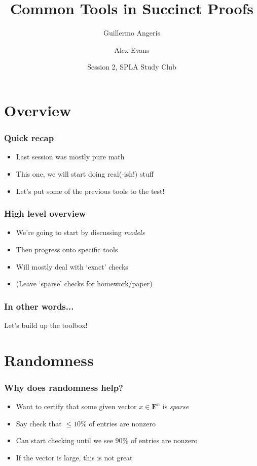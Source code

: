 \documentclass{beamer}
\title{Common Tools in Succinct Proofs}
\author{Guillermo Angeris \and Alex Evans}
\date{Session 2, SPLA Study Club}
\newcommand{\field}{\mathbf{F}}
\begin{document}
	\begin{frame}
		\titlepage
	\end{frame}
	
    \section{Overview}
    \begin{frame}
        \frametitle{Quick recap}
        \begin{itemize}\itemsep=12pt
            \item Last session was mostly pure math
            \item This one, we will start doing real(-ish!) stuff
            \pause
            \item Let's put some of the previous tools to the test!
        \end{itemize}
	\end{frame}

    \begin{frame}
        \frametitle{High level overview}
        \begin{itemize}\itemsep=12pt
            \item We're going to start by discussing \emph{models}
            \item Then progress onto specific tools
            \item Will mostly deal with `exact' checks
            \item (Leave `sparse' checks for homework/paper)
        \end{itemize}
    \end{frame}

    \begin{frame}
        \frametitle{In other words...}
        \pause
        \begin{center}
            {\Large Let's build up the toolbox!} 
        \end{center}
    \end{frame}

    \section{Randomness}
    \begin{frame}
        \frametitle{Why does randomness help?}
        \begin{itemize}\itemsep=12pt
            \item Want to certify that some given vector $x \in \field^n$ is \emph{sparse}
            \item Say check that $\le 10\%$ of entries are nonzero
            \pause
            \item Can start checking until we see $90\%$ of entries are nonzero
            \item If the vector is large, this is not great
        \end{itemize}
    \end{frame}
\end{document}
